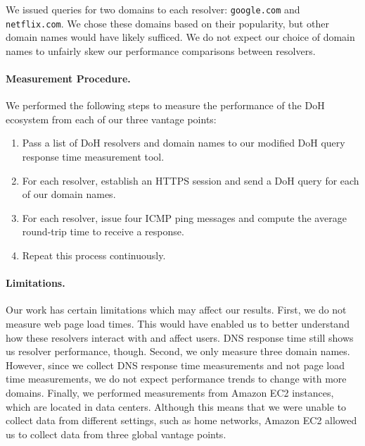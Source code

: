 We issued queries for two domains to each resolver: \texttt{google.com} and \texttt{netflix.com}.
We chose these domains based on their popularity, but other domain names would have likely sufficed.
We do not expect our choice of domain names to unfairly skew our performance comparisons between resolvers.

\paragraph{Measurement Procedure.}
We performed the following steps to measure the performance of the DoH ecosystem from each of our three vantage points:
\begin{enumerate}
    \item Pass a list of DoH resolvers and domain names to our modified DoH query response time measurement tool.
    \item For each resolver, establish an HTTPS session and send a DoH query for each of our domain names.
    \item For each resolver, issue four ICMP ping messages and compute the average round-trip time to receive a response.
    \item Repeat this process continuously.
\end{enumerate}

\paragraph{Limitations.}
Our work has certain limitations which may affect our results. 
First, we do not measure web page load times. 
This would have enabled us to better understand how these resolvers interact with and affect users. 
DNS response time still shows us resolver performance, though. 
Second, we only measure three domain names. 
However, since we collect DNS response time measurements and not page load time measurements, we do not expect performance trends to change with more domains.
Finally, we performed measurements from Amazon EC2 instances, which are located in data centers. 
Although this means that we were unable to collect data from different settings, such as home networks, Amazon EC2 allowed us to collect data from three global vantage points. 

